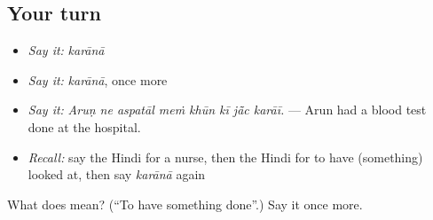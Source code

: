 \subsection*{Your turn}
\begin{itemize}
\raggedright
  \item \emph{Say it:} \emph{karānā}
  \item \emph{Say it:} \emph{karānā}, once more
  \item \emph{Say it:} \emph{Aruṇ ne aspatāl meṁ khūn kī jā̃c karāī.} — Arun had a blood test done at the hospital.
  \item \emph{Recall:} say the Hindi for a nurse, then the Hindi for to have (something) looked at, then say \emph{karānā} again
\end{itemize}

\begin{tcolorbox}[breakable,colback=teal!4,colframe=teal!35!black,title={Before you move on}]
What does  mean? (\textquotedblleft{}To have something done\textquotedblright{}.) Say it once more.
\end{tcolorbox}
